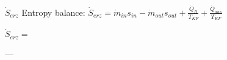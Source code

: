 \( \dot{S}_{erz} \)  
Entropy balance: \( \dot{S}_{erz} = \dot{m}_{in} s_{in} - \dot{m}_{out} s_{out} + \frac{\dot{Q}_R}{T_{KF}} + \frac{\dot{Q}_{aus}}{T_{KF}} \)  

\( \dot{S}_{erz} = \)  

---